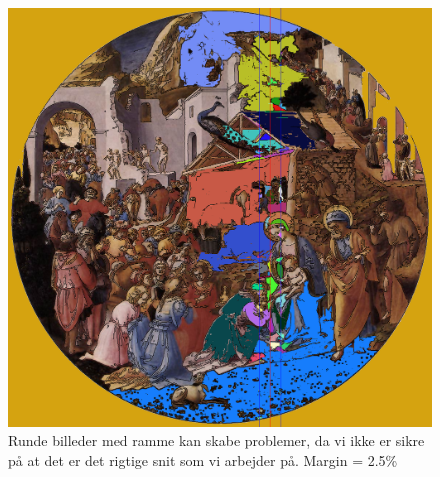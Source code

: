 \begin{figure}[h!!]
	\begin{center}
		\includegraphics[scale=0.3,angle=0]{afsnit/afprovning/billeder/FFadorat.png}
	\end{center}
	\caption[]{Runde billeder med ramme kan skabe problemer, da vi ikke
	er sikre på at det er det rigtige snit som vi arbejder på. Margin =
	2.5\%}
	\label{FFadorat}
\end{figure}
\clearpage

